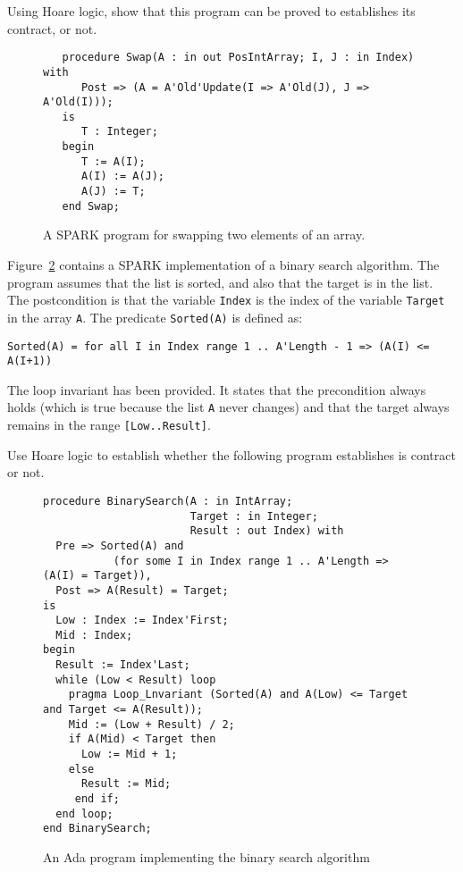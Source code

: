 Using Hoare logic, show that this program can be proved to establishes its contract, or not. 

\begin{figure}[!h]
\begin{verbatim}
   procedure Swap(A : in out PosIntArray; I, J : in Index) with
      Post => (A = A'Old'Update(I => A'Old(J), J => A'Old(I)));
   is
      T : Integer;
   begin
      T := A(I);
      A(I) := A(J);
      A(J) := T;
   end Swap;
\end{verbatim}
\caption{A SPARK program for swapping two elements of an array.}
\label{fig:array-swap}
\end{figure}


Figure~\ref{fig:binary-search} contains a SPARK implementation of a binary search algorithm. The program assumes that the list is sorted, and also that the target is in the list. The postcondition is that the variable \verb+Index+ is the index of the variable \verb+Target+ in the array \verb+A+. The predicate \verb+Sorted(A)+ is defined as:

\quad \verb|Sorted(A) = for all I in Index range 1 .. A'Length - 1 => (A(I) <= A(I+1))|

The loop invariant has been provided. It states that the precondition always holds (which is true because the list \verb+A+ never changes) and that the target always remains in the range \verb+[Low..Result]+.

Use Hoare logic to establish whether the following program establishes is contract or not. 


\begin{figure}[!t]
\begin{verbatim}
procedure BinarySearch(A : in IntArray; 
                       Target : in Integer;
                       Result : out Index) with
  Pre => Sorted(A) and
           (for some I in Index range 1 .. A'Length => (A(I) = Target)),
  Post => A(Result) = Target;
is
  Low : Index := Index'First;
  Mid : Index;
begin
  Result := Index'Last;
  while (Low < Result) loop
    pragma Loop_Lnvariant (Sorted(A) and A(Low) <= Target and Target <= A(Result));
    Mid := (Low + Result) / 2;
    if A(Mid) < Target then
      Low := Mid + 1;
    else
      Result := Mid;
     end if;
  end loop;
end BinarySearch;
\end{verbatim}
\caption{An Ada program implementing the binary search algorithm}
\label{fig:binary-search}
\end{figure}

